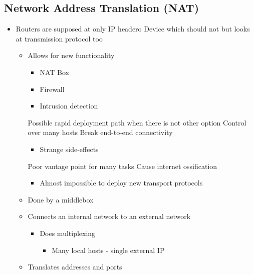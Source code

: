 \subsection{Network Address Translation (NAT)}
\begin{itemize}
    \item Routers are supposed at only IP headero
     Device which should not but looks at transmission protocol too
        \begin{itemize}
            \item Allows for new functionality
                \begin{itemize}
                    \item NAT Box
                    \item Firewall
                    \item Intrusion detection
                \end{itemize}
                \ipro Possible rapid deployment path when there is not other option 
            \ipro Control over many hosts
            \icon Break end-to-end connectivity
                \begin{itemize}
                    \item Strange side-effects
                \end{itemize}
            \icon Poor vantage point for many tasks
            \icon Cause internet ossification
                \begin{itemize}
                    \item Almost impossible to deploy new transport protocols
                \end{itemize}
        \end{itemize}
        \begin{itemize}
            \item Done by a middlebox
            \item Connects an internal network to an external network
                \begin{itemize}
                    \item Does multiplexing
                        \begin{itemize}
                            \item Many local hosts - single external IP
                        \end{itemize}
                \end{itemize}
            \item Translates addresses and ports

\end{itemize}
\end{itemize}
